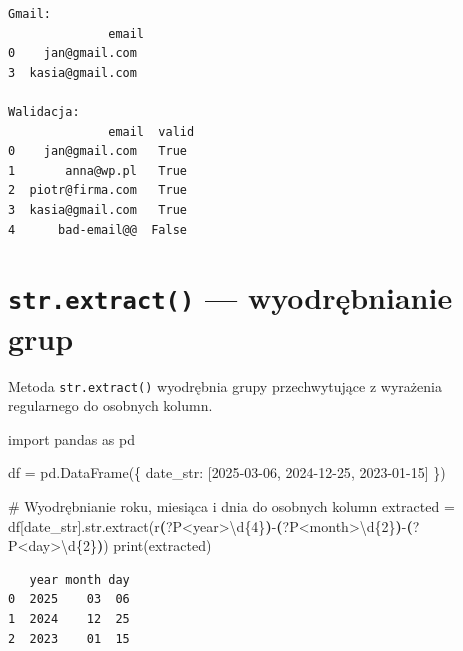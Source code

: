 \documentclass[
  polish,
  letterpaper,
  DIV=11,
  numbers=noendperiod]{scrreprt}
\newenvironment{Shaded}{\begin{snugshade}}{\end{snugshade}}
\newcommand{\BuiltInTok}[1]{\textcolor[rgb]{0.00,0.23,0.31}{#1}}
\newcommand{\CommentTok}[1]{\textcolor[rgb]{0.37,0.37,0.37}{#1}}
\newcommand{\DecValTok}[1]{\textcolor[rgb]{0.68,0.00,0.00}{#1}}
\newcommand{\FunctionTok}[1]{\textcolor[rgb]{0.28,0.35,0.67}{#1}}
\newcommand{\ImportTok}[1]{\textcolor[rgb]{0.00,0.46,0.62}{#1}}
\newcommand{\KeywordTok}[1]{\textcolor[rgb]{0.00,0.23,0.31}{\textbf{#1}}}
\newcommand{\NormalTok}[1]{\textcolor[rgb]{0.00,0.23,0.31}{#1}}
\newcommand{\OperatorTok}[1]{\textcolor[rgb]{0.37,0.37,0.37}{#1}}
\newcommand{\StringTok}[1]{\textcolor[rgb]{0.13,0.47,0.30}{#1}}
\newcommand{\VerbatimStringTok}[1]{\textcolor[rgb]{0.13,0.47,0.30}{#1}}
\begin{document}
\begin{verbatim}
Gmail:
              email
0    jan@gmail.com
3  kasia@gmail.com

Walidacja:
              email  valid
0    jan@gmail.com   True
1       anna@wp.pl   True
2  piotr@firma.com   True
3  kasia@gmail.com   True
4      bad-email@@  False
\end{verbatim}

\section{\texorpdfstring{\texttt{str.extract()} --- wyodrębnianie
grup}{str.extract() --- wyodrębnianie grup}}\label{str.extract-wyodrux119bnianie-grup}

Metoda \texttt{str.extract()} wyodrębnia grupy przechwytujące z
wyrażenia regularnego do osobnych kolumn.

\begin{Shaded}
\begin{Highlighting}[]
\ImportTok{import}\NormalTok{ pandas }\ImportTok{as}\NormalTok{ pd}

\NormalTok{df }\OperatorTok{=}\NormalTok{ pd.DataFrame(\{}
    \StringTok{\textquotesingle{}date\_str\textquotesingle{}}\NormalTok{: [}\StringTok{\textquotesingle{}2025{-}03{-}06\textquotesingle{}}\NormalTok{, }\StringTok{\textquotesingle{}2024{-}12{-}25\textquotesingle{}}\NormalTok{, }\StringTok{\textquotesingle{}2023{-}01{-}15\textquotesingle{}}\NormalTok{]}
\NormalTok{\})}

\CommentTok{\# Wyodrębnianie roku, miesiąca i dnia do osobnych kolumn}
\NormalTok{extracted }\OperatorTok{=}\NormalTok{ df[}\StringTok{\textquotesingle{}date\_str\textquotesingle{}}\NormalTok{].}\BuiltInTok{str}\NormalTok{.extract(}\VerbatimStringTok{r\textquotesingle{}}\KeywordTok{(}\FunctionTok{?P\textless{}year\textgreater{}}\DecValTok{\textbackslash{}d}\OperatorTok{\{4\}}\KeywordTok{)}\VerbatimStringTok{{-}}\KeywordTok{(}\FunctionTok{?P\textless{}month\textgreater{}}\DecValTok{\textbackslash{}d}\OperatorTok{\{2\}}\KeywordTok{)}\VerbatimStringTok{{-}}\KeywordTok{(}\FunctionTok{?P\textless{}day\textgreater{}}\DecValTok{\textbackslash{}d}\OperatorTok{\{2\}}\KeywordTok{)}\VerbatimStringTok{\textquotesingle{}}\NormalTok{)}
\BuiltInTok{print}\NormalTok{(extracted)}
\end{Highlighting}
\end{Shaded}

\begin{verbatim}
   year month day
0  2025    03  06
1  2024    12  25
2  2023    01  15
\end{verbatim}
\end{document}
